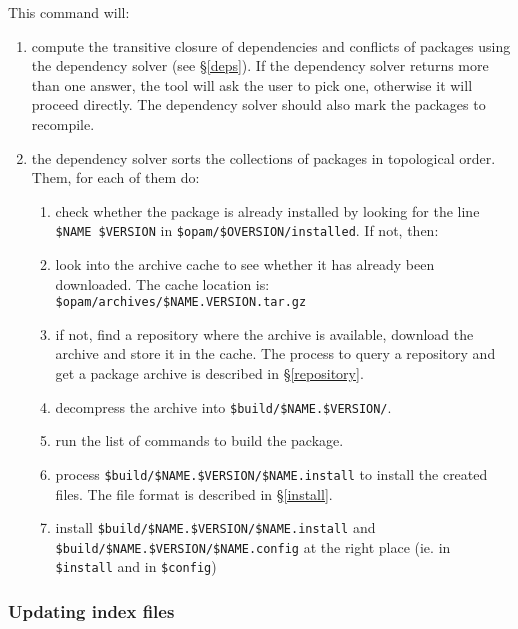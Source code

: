 \documentclass[a4paper,11pt]{article}
\begin{document}
This command will:

\begin{enumerate}

\item compute the transitive closure of dependencies and conflicts of
  packages using the dependency solver (see \S\ref{deps}). If the
  dependency solver returns more than one answer, the tool will ask
  the user to pick one, otherwise it will proceed directly. The
  dependency solver should also mark the packages to recompile.

\item the dependency solver sorts the collections of packages in
  topological order. Them, for each of them do:

\begin{enumerate}

\item check whether the package is already installed by looking for
  the line \verb+$NAME $VERSION+ in \verb+$opam/$OVERSION/installed+.
  If not, then:

\item look into the archive cache to see whether it has already been
  downloaded. The cache location is:
  \verb+$opam/archives/$NAME.VERSION.tar.gz+

\item if not, find a repository where the archive is available,
  download the archive and store it in the cache. The process to query
  a repository and get a package archive is described in
  \S\ref{repository}.

\item decompress the archive into \verb+$build/$NAME.$VERSION/+.

\item run the list of commands to build the package.

\item process \verb+$build/$NAME.$VERSION/$NAME.install+ to install
  the created files. The file format is described in \S\ref{install}.

\item install \verb+$build/$NAME.$VERSION/$NAME.install+ and
  \verb+$build/$NAME.$VERSION/$NAME.config+ at the right place (ie. in
  \verb+$install+ and in \verb+$config+)

\end{enumerate}
\end{enumerate}

\subsubsection{Updating index files}
\end{document}
